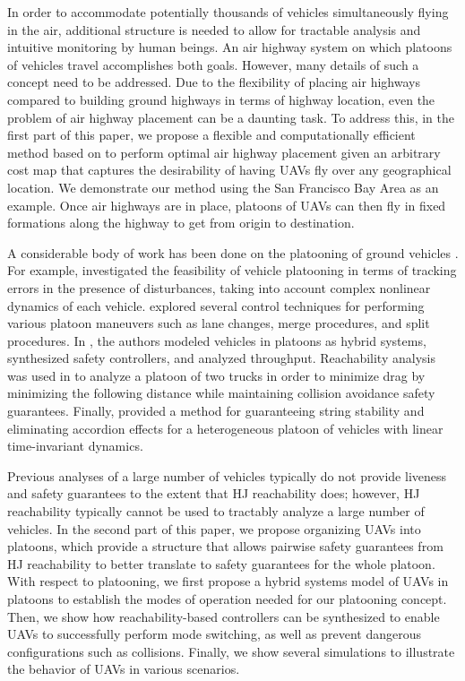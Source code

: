 In order to accommodate potentially thousands of vehicles simultaneously flying in the air, additional structure is needed to allow for tractable analysis and intuitive monitoring by human beings. An air highway system on which platoons of vehicles travel accomplishes both goals. However, many details of such a concept need to be addressed. Due to the flexibility of placing air highways compared to building ground highways in terms of highway location, even the problem of air highway placement can be a daunting task. To address this, in the first part of this paper, we propose a flexible and computationally efficient method based on \cite{Sethian96} to perform optimal air highway placement given an arbitrary cost map that captures the desirability of having UAVs fly over any geographical location. We demonstrate our method using the San Francisco Bay Area as an example. Once air highways are in place, platoons of UAVs can then fly in fixed formations along the highway to get from origin to destination.

A considerable body of work has been done on the platooning of ground vehicles \cite{Kavathekar11}. For example, \cite{McMahon90} investigated the feasibility of vehicle platooning in terms of tracking errors in the presence of disturbances, taking into account complex nonlinear dynamics of each vehicle. \cite{Hedrick92} explored several control techniques for performing various platoon maneuvers such as lane changes, merge procedures, and split procedures. In \cite{Lygeros98}, the authors modeled vehicles in platoons as hybrid systems, synthesized safety controllers, and analyzed throughput. Reachability analysis was used in \cite{Alam11} to analyze a platoon of two trucks in order to minimize drag by minimizing the following distance while maintaining collision avoidance safety guarantees. Finally, \cite{Sabau16} provided a method for guaranteeing string stability and eliminating accordion effects for a heterogeneous platoon of vehicles with linear time-invariant dynamics.

Previous analyses of a large number of vehicles typically do not provide liveness and safety guarantees to the extent that HJ reachability does; however, HJ reachability typically cannot be used to tractably analyze a large number of vehicles. In the second part of this paper, we propose organizing UAVs into platoons, which provide a structure that allows pairwise safety guarantees from HJ reachability to better translate to safety guarantees for the whole platoon. With respect to platooning, we first propose a hybrid systems model of UAVs in platoons to establish the modes of operation needed for our platooning concept. Then, we show how reachability-based controllers can be synthesized to enable UAVs to successfully perform mode switching, as well as prevent dangerous configurations such as collisions. Finally, we show several simulations to illustrate the behavior of UAVs in various scenarios.